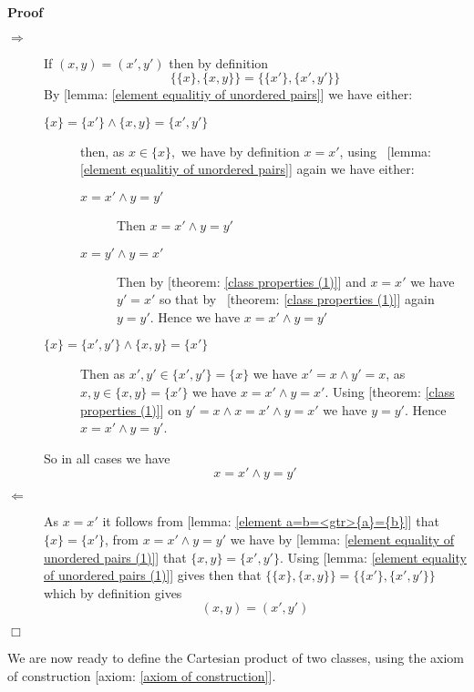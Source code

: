 \documentclass{book}
\newenvironment{proof}{\noindent\textbf{Proof\ }}{\hspace*{\fill}$\Box$\medskip}
\begin{document}
\begin{proof}
  
  \begin{description}
    \item[$\Rightarrow$] If $(x, y) = (x', y')$ then by definition
    \[ \{ \{ x \}, \{ x, y \} \} = \{ \{ x' \}, \{ x', y' \} \} \]
    By [lemma: \ref{element equalitiy of unordered pairs}] we have either:
    \begin{description}
      \item[$\{ x \} = \{ x' \} \wedge \{ x, y \} = \{ x', y' \}$] then, as $x
      \in \{ x \},$ we have by definition $x = x'$, using \ [lemma:
      \ref{element equalitiy of unordered pairs}] again we have either:
      \begin{description}
        \item[$x = x' \wedge y = y'$] Then $x = x' \wedge y = y'$
        
        \item[$x = y' \wedge y = x'$] Then by [theorem: \ref{class properties
        (1)}] and $x = x'$ we have $y' = x'$ so that by \ [theorem: \ref{class
        properties (1)}] again $y = y'$. Hence we have $x = x' \wedge y = y'$
      \end{description}
      \item[$\{ x \} = \{ x', y' \} \wedge \{ x, y \} = \{ x' \}$] Then as
      $x', y' \in \{ x', y' \} = \{ x \}$ we have $x' = x \wedge y' = x$, as
      $x, y \in \{ x, y \} = \{ x' \}$ we have $x = x' \wedge y = x'$. Using
      [theorem: \ref{class properties (1)}] on $y' = x \wedge x = x' \wedge y
      = x'$ we have $y = y'$. Hence $x = x' \wedge y = y'$.
    \end{description}
    So in all cases we have
    \[ x = x' \wedge y = y' \]
    \item[$\Leftarrow$] As $x = x'$ it follows from [lemma: \ref{element
    a=b=<gtr>{a}={b}}] that $\{ x \} = \{ x' \}$, from $x = x' \wedge y = y'$
    we have by [lemma: \ref{element equality of unordered pairs (1)}] that $\{
    x, y \} = \{ x', y' \}$. Using [lemma: \ref{element equality of unordered
    pairs (1)}] gives then that $\{ \{ x \}, \{ x, y \} \} = \{ \{ x' \}, \{
    x', y' \} \}$ which by definition gives
    \[ (x, y) = (x', y') \]
  \end{description}
\end{proof}

We are now ready to define the Cartesian product of two classes, using the
axiom of construction [axiom: \ref{axiom of construction}].
\end{document}
